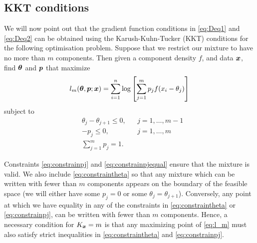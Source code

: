	\subsection{KKT conditions}
	\label{sec:KKT conditions}
	We will now point out that the gradient function conditions in \eqref{eq:Deq1} and \eqref{eq:Deq2} can be obtained using the Karush-Kuhn-Tucker (KKT) conditions \cite{Kuhn1951-ih} \cite{Karush2014-vk} for the following optimisation problem. Suppose that we restrict our mixture to have no more than $m$ components. Then given a component density $f$, and data ${\bm{{x}}}$, %
%
	find ${\bm{{\theta}}}$ and ${\bm{{p}}}$ that maximize
	\begin{equation}
		l_m({\bm{{\theta}}},{\bm{{p}}};{\bm{{x}}}) = \sum_{i=1}^n \log \left[\sum_{j=1}^m p_j f(x_i - \theta_j) \right]
		\label{eq:l_m}
	\end{equation}
	subject to 
	\begin{align}
		&\theta_j -\theta_{j+1} \leq 0, &&j=1,\dots,m-1
		\label{eq:constraintheta}\\
		&-p_j \leq 0, &&j=1,\dots,m
		\label{eq:constrainpj}\\
		&\sum_{j=1}^m p_j = 1.
		\label{eq:constrainpjequal}
	\end{align}

	Constraints \eqref{eq:constrainpj} and \eqref{eq:constrainpjequal} ensure that the mixture is valid. We also include \eqref{eq:constraintheta} so that any mixture which can be written with fewer than $m$ components appears on the boundary of the feasible space (we will either have some $p_j = 0$ or some $\theta_j = \theta_{j+1}$). Conversely, any point at which we have equality in any of the constraints in \eqref{eq:constraintheta} or \eqref{eq:constrainpj}, can be written with fewer than $m$ components. Hence, a necessary condition for $K_{\bm{{x}}} = m$ is that any maximizing point of \eqref{eq:l_m} must also satisfy strict inequalities in \eqref{eq:constraintheta} and \eqref{eq:constrainpj}.

